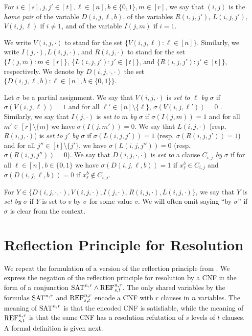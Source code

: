 \begin{definition}
\label{def:home-pair-and-set-to}
For $i \in [s], j,j' \in [t], \ell \in [n], b \in \{0,1\}, m \in [r]$, we say that $(i,j)$ is the \emph{home pair} of the variable $D(i,j,\ell,b)$, of the variables $R(i,j,j')$, $L(i,j,j')$, $V(i,j,\ell)$ if $i \neq 1$, and of the variable $I(j,m)$ if $i=1$.

We write $V(i,j,\cdot)$ to stand for the set $\{V(i,j,\ell) : \ell \in [n] \}$. Similarly, we write $I(j,\cdot), L(i,j,\cdot)$, and $R(i,j,\cdot)$ to stand for the set $\{I(j,m) : m \in [r]\}$, $\{L(i,j,j') : j' \in [t]\}$, and $\{R(i,j,j') : j' \in [t]\}$, respectively. We denote by $D(i,j,\cdot,\cdot)$ the set $\{D(i,j,\ell,b) : \ell \in [n], b \in \{0,1\}\}$. 

Let $\sigma$ be a partial assignment. We say that $V(i,j,\cdot)$ is \emph{set to} $\ell$ \emph{by} $\sigma$ if $\sigma(V(i,j,\ell)) = 1$ and for all $\ell' \in [n] \! \setminus \{\ell\}$, $\sigma(V(i,j,\ell')) = 0$ . Similarly, we say that $I(j,\cdot)$ is \emph{set to} $m$ \emph{by} $\sigma$ if $\sigma(I(j,m)) = 1$ and for all $m' \in [r]\! \setminus \! \{m\}$ we have $\sigma(I(j,m')) = 0$.
We say that $L(i,j,\cdot)$ (resp. $R(i,j,\cdot)$)   is \emph{set to} $j'$ \emph{by} $\sigma$ if $\sigma(L(i,j,j')) = 1$ (resp. $\sigma(R(i,j,j')) = 1$) and for all $j'' \in [t] \! \setminus \! \{j'\}$,  we have $\sigma(L(i,j,j'')) = 0$ (resp. $\sigma(R(i,j,j'')) = 0$). 
We say that $D(i,j,\cdot, \cdot)$ is \emph{set to} a clause $C_{i,j}$ \emph{by} $\sigma$ if for all $\ell \in [n], b \in \{0,1\}$ we have $\sigma(D(i,j,\ell,b)) = 1$ if $x_\ell^b \in C_{i,j}$ and $\sigma(D(i,j,\ell,b)) = 0$ if $x_\ell^b \not \in C_{i,j}$. 

For $Y \in \{D(i,j,\cdot,\cdot), V(i,j,\cdot), I(j,\cdot), R(i,j,\cdot), L(i,j,\cdot)\}$, we say that $Y$ is \emph{set by} $\sigma$ if $Y$ is set to $v$ by $\sigma$ for some value $v$. We will often omit saying ``by $\sigma$'' if $\sigma$ is clear from the context.
\end{definition}




\section{Reflection Principle for Resolution}
\label{sec:refl-princ-for-res}
We repeat the formulation of a version of the reflection principle from \cite{Garlik2019-mfcs}.
We express the negation of the reflection principle for resolution by a CNF in the form of a conjunction $\textnormal{SAT}^{n,r} \land \textnormal{REF}^{n,r}_{s,t}$. The only shared variables by the formulas $\textnormal{SAT}^{n,r}$ and $\textnormal{REF}^{n,r}_{s,t}$ encode a CNF with $r$ clauses in $n$ variables. The meaning of $\textnormal{SAT}^{n,r}$ is that the encoded CNF is satisfiable, while the meaning of $\textnormal{REF}^{n,r}_{s,t}$ is that the same CNF has a resolution refutation of $s$ levels of $t$ clauses. A formal definition is given next.

